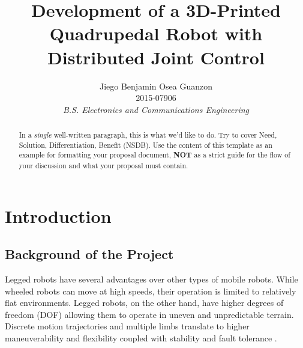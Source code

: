 \documentclass[english]{upeeei}
\begin{document}
\title{Development of a 3D-Printed Quadrupedal Robot with Distributed Joint Control} 

\author{
Jiego Benjamin Osea Guanzon\\ 2015-07906\\ \emph{B.S. Electronics and Communications Engineering}
\and
}


\othermembers{~}


\maketitle 
\begin{abstract} 

In a \emph{single} well-written paragraph, this is what we'd like to do.  Try to cover Need, Solution, Differentiation, Benefit (NSDB).  Use the content of this template as an example for formatting your proposal document, \textbf{NOT} as a strict guide for the flow of your discussion and what your proposal must contain.

\abstractsignature\end{abstract}

\begin{frontmatter} 

\setlength{\parskip}{0pt}

\tableofcontents{}

\listoffigures

\listoftables

\end{frontmatter} 

\def\MASTERDOC{true}

\cleardoublepage{}

\chapter{Introduction\label{cha:Introduction}}

\section{Background of the Project}

Legged robots have several advantages over other types of mobile robots. While wheeled robots can move at high speeds, their operation is limited to relatively flat environments. Legged robots, on the other hand, have higher degrees of freedom (DOF) allowing them to operate in uneven and unpredictable terrain. Discrete motion trajectories and multiple limbs translate to higher maneuverability and flexibility coupled with stability and fault tolerance \cite{quadrobotlegs}.
\end{document}
